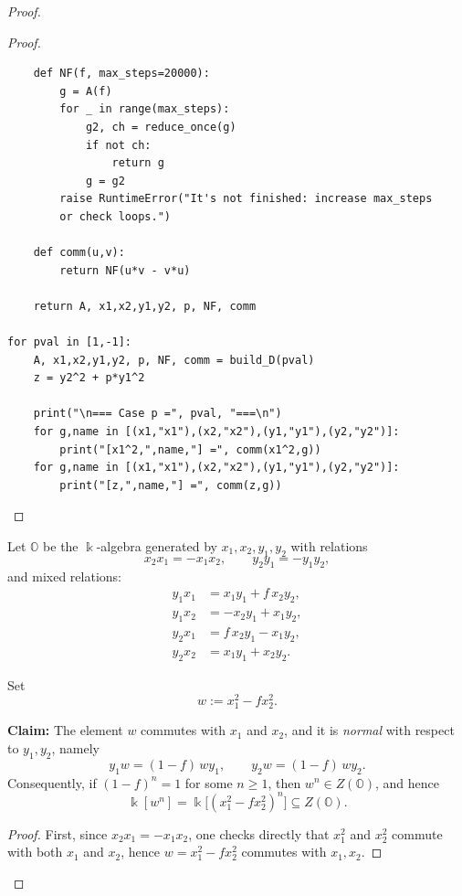 \documentclass{amsart}
\theoremstyle{definition}
\theoremstyle{remark}
\numberwithin{equation}{section}
\begin{document}
\begin{proof}
\begin{proof}
\begin{verbatim}
    def NF(f, max_steps=20000):
        g = A(f)
        for _ in range(max_steps):
            g2, ch = reduce_once(g)
            if not ch:
                return g
            g = g2
        raise RuntimeError("It's not finished: increase max_steps 
        or check loops.")

    def comm(u,v):
        return NF(u*v - v*u)

    return A, x1,x2,y1,y2, p, NF, comm

for pval in [1,-1]:
    A, x1,x2,y1,y2, p, NF, comm = build_D(pval)
    z = y2^2 + p*y1^2

    print("\n=== Case p =", pval, "===\n")
    for g,name in [(x1,"x1"),(x2,"x2"),(y1,"y1"),(y2,"y2")]:
        print("[x1^2,",name,"] =", comm(x1^2,g))
    for g,name in [(x1,"x1"),(x2,"x2"),(y1,"y1"),(y2,"y2")]:
        print("[z,",name,"] =", comm(z,g))
\end{verbatim}
\end{proof}

Let \(\mathbb{O}\) be the \(\Bbbk\)-algebra generated by \(x_1,x_2,y_1,y_2\) with relations
\begin{equation}\label{eq:O_internal}
x_2x_1=-x_1x_2,\qquad y_2y_1=-y_1y_2,
\end{equation}
and mixed relations:
\begin{align}
y_1x_1&=x_1y_1+f\,x_2y_2, \label{eq:O_m1}\\
y_1x_2&=-x_2y_1+x_1y_2, \label{eq:O_m2}\\
y_2x_1&=f\,x_2y_1-x_1y_2, \label{eq:O_m3}\\
y_2x_2&=x_1y_1+x_2y_2. \label{eq:O_m4}
\end{align}

Set
\[
w:=x_1^2-fx_2^2.
\]


{\bf Claim:} The element \(w\) commutes with \(x_1\) and \(x_2\), and it is \emph{normal} with respect to \(y_1,y_2\), namely
\[
y_1w=(1-f)\,w y_1,\qquad y_2w=(1-f)\,w y_2.
\]
Consequently, if \((1-f)^n=1\) for some \(n\ge 1\), then \(w^n\in Z(\mathbb{O})\), and hence
\[
\Bbbk[w^n]=\Bbbk\big[(x_1^2-fx_2^2)^n\big]\subseteq Z(\mathbb{O}).
\]


\begin{proof}
First, since \(x_2x_1=-x_1x_2\), one checks directly that \(x_1^2\) and \(x_2^2\) commute with both \(x_1\) and \(x_2\),
hence \(w=x_1^2-fx_2^2\) commutes with \(x_1,x_2\).


\end{proof}
\end{proof}
\end{document}
